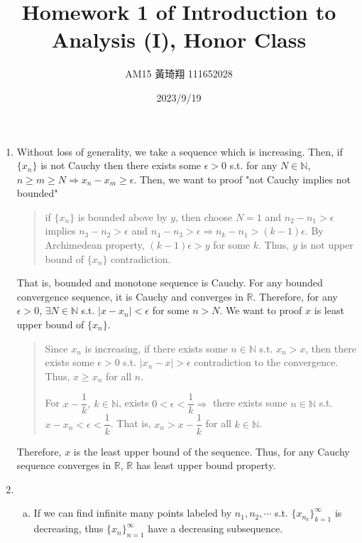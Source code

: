 \documentclass[12pt]{article}
\title{Homework 1 of Introduction to Analysis (I), Honor Class}
\author{AM15 黃琦翔 111652028}
\date{2023/9/19}
\begin{document}
\maketitle
\begin{enumerate}
    \item Without loss of generality, we take a sequence which is increasing. 
    Then, if $\lbrace x_n\rbrace$ is not Cauchy then there exists some $\epsilon > 0$ s.t. for any $N \in \mathbb{N}$, $n \geq m \geq N\Rightarrow x_n - x_m \geq \epsilon$.
    Then, we want to proof "not Cauchy implies not bounded"\begin{quote}
        if $\lbrace x_n\rbrace$ is bounded above by $y$, then choose $N = 1$ and $n_2 - n_1 > \epsilon$ implies $n_3 - n_2 > \epsilon$ and $n_4 - n_3 > \epsilon\Rightarrow n_k - n_1 > (k-1)\epsilon$.
        By Archimedean property, $(k-1)\epsilon > y$ for some $k$. Thus, $y$ is not upper bound of $\lbrace x_n \rbrace$ contradiction.
    \end{quote}
    That is, bounded and monotone sequence is Cauchy.
    For any bounded convergence sequence, it is Cauchy and converges in $\mathbb{R}$.
    Therefore, for any $\epsilon > 0$, $\exists N \in \mathbb{N}$ s.t. $|x - x_n| < \epsilon$ for some $n > N$.
    We want to proof $x$ is least upper bound of $\lbrace x_n\rbrace$.\begin{quote}
        Since $x_n$ is increasing, if there exists some $n \in\mathbb{N}$ s.t. $x_n > x$, 
        then there exists some $\epsilon > 0$ s.t. $|x_n -x| > \epsilon$ contradiction to the convergence.
        Thus, $x \geq x_n$ for all $n$.
        
        For $x - \dfrac{1}{k},\ k \in \mathbb{N}$, exists $0 < \epsilon < \dfrac{1}{k}\Rightarrow$ there exists some $n \in \mathbb{N}$ s.t. $x - x_n < \epsilon < \dfrac{1}{k}$.
        That is, $x_n > x-\dfrac{1}{k}$ for all $k \in \mathbb{N}$.
    \end{quote}
    Therefore, $x$ is the least upper bound of the sequence.
    Thus, for any Cauchy sequence converges in $\mathbb{R}$, $\mathbb{R}$ has least upper bound property.

    \item \begin{enumerate}[(a)]
        \item If we can find infinite many points labeled by $n_1, n_2, \cdots$ s.t. $\lbrace x_{n_k}\rbrace_{k=1}^\infty$ is decreasing, thus $\lbrace x_n\rbrace_{n=1}^\infty$ have a decreasing subsequence.
        

\end{enumerate}
\end{enumerate}
\end{document}
